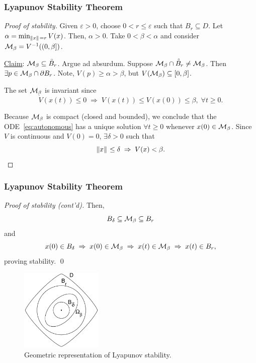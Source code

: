 \begin{frame}
    \frametitle{Lyapunov Stability Theorem}

    \begin{proof}[Proof of stability]
        Given $\varepsilon > 0$, choose $0 < r \leq \varepsilon$ such that $B_r
        \subseteq D$. Let $\alpha = \min_{\|{x}\|_{{}_{}}=r} V(x)$. Then, $\alpha >
        0$. Take $0 < \beta < \alpha$ and consider $\mathcal{M}_\beta = V^{-1}((0,
        \beta])$.

        \underline{Claim}: $\mathcal{M}_\beta \subseteq \accentset{\circ}{B}_r$.
        Argue ad absurdum. Suppose $\mathcal{M}_\beta \cap \accentset{\circ}{B}_r
        \neq \mathcal{M}_\beta$. Then $\exists p \in \mathcal{M}_\beta \cap \partial B_r$.
        Note, $V(p) \geq \alpha > \beta$, but $V(\mathcal{M}_\beta) \subseteq
        [0,\beta]$.

        The set $\mathcal{M}_\beta$ is invariant since \[ \dot{V}(x(t)) \leq 0 \;
        \Rightarrow \; V(x(t)) \leq V(x(0)) \leq \beta, \; \forall t \geq 0. \]

        Because $\mathcal{M}_\beta$ is compact (closed and bounded), we conclude that
        the ODE~\eqref{eq:autonomous} has a unique solution $\forall t \geq 0$
        whenever $x(0) \in \mathcal{M}_\beta$. Since $V$ is continuous and $V(0) =
        0$, $\exists \delta > 0$ such that \[ \|{x}\|_{{}_{}} \leq \delta \;
        \Rightarrow \; V(x) < \beta. \]
    \end{proof}
\end{frame}

\begin{frame}
    \frametitle{Lyapunov Stability Theorem}

    \begin{proof}[Proof of stability (cont'd)]
        Then, \[ B_\delta \subseteq \mathcal{M}_\beta \subseteq B_r \] and 
        \[ x(0) \in B_\delta \; \Rightarrow \; x(0) \in \mathcal{M}_\beta \;
        \Rightarrow \; x(t) \in \mathcal{M}_\beta \; \Rightarrow \; x(t) \in B_r, \]
        proving stability. \hfill \qed
    \end{proof}

    \begin{figure}[bth]
        \centering
        \includegraphics[width=0.35\textwidth]{figures/lyap_geometry.png} 
        \caption{\footnotesize Geometric representation of Lyapunov stability.}
    \end{figure}
\end{frame}

